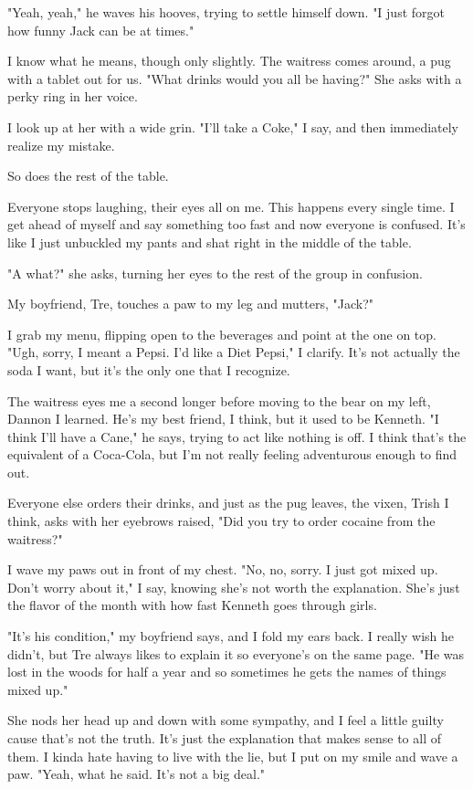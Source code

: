 "Yeah, yeah," he waves his hooves, trying to settle himself down. "I just forgot how funny Jack can be at times."

I know what he means, though only slightly. The waitress comes around, a pug with a tablet out for us. "What drinks would you all be having?" She asks with a perky ring in her voice.

I look up at her with a wide grin. "I'll take a Coke," I say, and then immediately realize my mistake.

So does the rest of the table.

Everyone stops laughing, their eyes all on me. This happens every single time. I get ahead of myself and say something too fast and now everyone is confused. It's like I just unbuckled my pants and shat right in the middle of the table.

"A what?" she asks, turning her eyes to the rest of the group in confusion.

My boyfriend, Tre, touches a paw to my leg and mutters, "Jack?"

I grab my menu, flipping open to the beverages and point at the one on top. "Ugh, sorry, I meant a Pepsi. I'd like a Diet Pepsi," I clarify. It's not actually the soda I want, but it's the only one that I recognize.

The waitress eyes me a second longer before moving to the bear on my left, Dannon I learned. He's my best friend, I think, but it used to be Kenneth. "I think I'll have a Cane," he says, trying to act like nothing is off. I think that's the equivalent of a Coca-Cola, but I'm not really feeling adventurous enough to find out.

Everyone else orders their drinks, and just as the pug leaves, the vixen, Trish I think, asks with her eyebrows raised, "Did you try to order cocaine from the waitress?"

I wave my paws out in front of my chest. "No, no, sorry. I just got mixed up. Don't worry about it," I say, knowing she's not worth the explanation. She's just the flavor of the month with how fast Kenneth goes through girls.

"It's his condition," my boyfriend says, and I fold my ears back. I really wish he didn't, but Tre always likes to explain it so everyone's on the same page. "He was lost in the woods for half a year and so sometimes he gets the names of things mixed up."

She nods her head up and down with some sympathy, and I feel a little guilty cause that's not the truth. It's just the explanation that makes sense to all of them. I kinda hate having to live with the lie, but I put on my smile and wave a paw. "Yeah, what he said. It's not a big deal."

